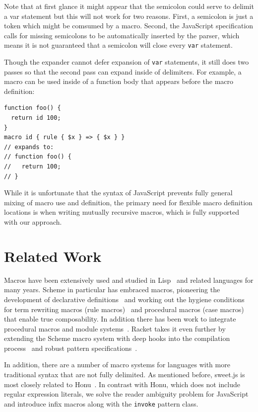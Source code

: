 \documentclass[preprint,10pt]{sigplanconf}
\begin{document}
Note that at first glance it might appear that the semicolon could
serve to delimit a var statement but this will not work for two
reasons. First, a semicolon is just a token which might be comsumed by
a macro. Second, the JavaScript specification calls for missing
semicolons to be automatically inserted by the parser, which means
it is not guaranteed that a semicolon will close every \verb!var!
statement.

Though the expander cannot defer expansion of \verb!var!
statements, it still does two passes so that
the second pass can expand inside of delimiters. For example, a macro
can be used inside of a function body that appears before the macro definition:
\begin{lstlisting}
function foo() {
  return id 100;
}
macro id { rule { $x } => { $x } }
// expands to:
// function foo() {
//   return 100;
// }
\end{lstlisting}


While it is unfortunate that the syntax of JavaScript prevents fully
general mixing of macro use and definition, the primary need for
flexible macro definition locations is when writing mutually recursive
macros, which is fully supported with our approach.

\section{Related Work}
\label{sec:related}

Macros have been extensively used and studied in Lisp~\cite{Foderaro1983,Pitman1980} and related languages for many years. Scheme in particular has embraced macros, pioneering the development of declarative definitions~\cite{Kohlbecker1987} and working out the hygiene conditions for term rewriting macros (rule macros)~\cite{Clinger1991} and procedural macros (case macros)~\cite{Hieb1992} that enable true composability.
In addition there has been work to integrate procedural macros and module systems~\cite{Flatt2002,Ghuloum2007}.
Racket takes it even further by extending the Scheme macro system with deep hooks into the compilation process~\cite{Flatt2012,Tobin-Hochstadt2011} and robust pattern specifications~\cite{Culpepper2010a}.

In addition, there are a number of macro systems for languages with more traditional syntax that are not fully delimited. 
As mentioned before, sweet.js is most closely related to Honu~\cite{Rafkind2012,Rafkind2013}. In contrast with Honu, which does not include regular expression literals, we solve the reader ambiguity problem for JavaScript and introduce infix macros along with the \verb!invoke! pattern class.
\end{document}
